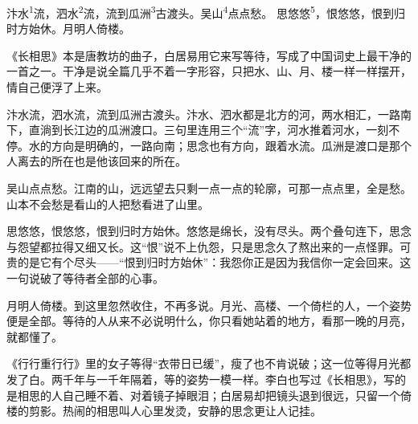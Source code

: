 
\begin{poem}
汴水\textsuperscript{1}流，泗水\textsuperscript{2}流，流到瓜洲\textsuperscript{3}古渡头。吴山\textsuperscript{4}点点愁。
思悠悠\textsuperscript{5}，恨悠悠，恨到归时方始休。月明人倚楼。
\end{poem}

\begin{annotations}
\end{annotations}

\begin{appreciation}
《长相思》本是唐教坊的曲子，白居易用它来写等待，写成了中国词史上最干净的一首之一。干净是说全篇几乎不着一字形容，只把水、山、月、楼一样一样摆开，情自己便浮了上来。

汴水流，泗水流，流到瓜洲古渡头。汴水、泗水都是北方的河，两水相汇，一路南下，直淌到长江边的瓜洲渡口。三句里连用三个“流”字，河水推着河水，一刻不停。水的方向是明确的，一路向南；思念也有方向，跟着水流。瓜洲是渡口是那个人离去的所在也是他该回来的所在。

吴山点点愁。江南的山，远远望去只剩一点一点的轮廓，可那一点点里，全是愁。山本不会愁是看山的人把愁看进了山里。

思悠悠，恨悠悠，恨到归时方始休。悠悠是绵长，没有尽头。两个叠句连下，思念与怨望都拉得又细又长。这“恨”说不上仇怨，只是思念久了熬出来的一点怪罪。可贵的是它有个尽头——“恨到归时方始休”：我怨你正是因为我信你一定会回来。这一句说破了等待者全部的心事。

月明人倚楼。到这里忽然收住，不再多说。月光、高楼、一个倚栏的人，一个姿势便是全部。等待的人从来不必说明什么，你只看她站着的地方，看那一晚的月亮，就都懂了。

《行行重行行》里的女子等得“衣带日已缓”，瘦了也不肯说破；这一位等得月光都发了白。两千年与一千年隔着，等的姿势一模一样。李白也写过《长相思》，写的是相思的人自己睡不着、对着镜子掉眼泪；白居易却把镜头退到很远，只留一个倚楼的剪影。热闹的相思叫人心里发烫，安静的思念更让人记挂。
\end{appreciation}
